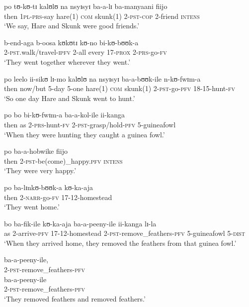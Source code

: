 \begin{exe}
\ex \gll po tʊ-kʊ-tɪ kalʊlʊ na nsyɪsyɪ ba-a-lɪ ba-manyaani fiijo\\
then \textsc{1pl}-\textsc{prs}-say hare(1) \textsc{com} skunk(1) 2-\textsc{pst}-\textsc{cop} 2-friend \textsc{intens}\\
\glt \lq We say, Hare and Skunk were good friends.'

\ex \gll b-end-aga b-oosa kʊkʊtɪ kʊ-no bi-kʊ-bʊʊk-a\\
2-\textsc{pst}.walk/travel-\textsc{ipfv} 2-all every 17-\textsc{prox} 2-\textsc{prs}-go-\textsc{fv}\\
\glt \lq They went together wherever they went.'

\ex \gll po leelo ii-sikʊ lɪ-mo kalʊlʊ na nsyɪsyɪ ba-a-bʊʊk-ile n-kʊ-fwɪm-a\\
then now/but 5-day 5-one hare(1) \textsc{com} skunk(1) 2-\textsc{pst}-go-\textsc{pfv} 18-15-hunt-\textsc{fv}\\
\glt \lq So one day Hare and Skunk went to hunt.'

\ex \gll po bo bi-kʊ-fwɪm-a ba-a-kol-ile ii-kanga\\
then as 2-\textsc{prs}-hunt-\textsc{fv} 2-\textsc{pst}-grasp/hold-\textsc{pfv} 5-guineafowl\\
\glt \lq  When they were hunting they caught a guinea fowl.'

\ex \gll po ba-a-hobwike fiijo\\
then 2-\textsc{pst}-be(come)\_happy.\textsc{pfv} \textsc{intens}\\
\glt \lq They were very happy.'

\ex \gll po ba-lɪnkʊ-bʊʊk-a kʊ-ka-aja\\
then 2-\textsc{narr}-go-\textsc{fv} 17-12-homestead\\
\glt \lq They went home.'

\ex \gll bo ba-fik-ile kʊ-ka-aja ba-a-peeny-ile ii-kanga lɪ-la\\
as 2-arrive-\textsc{pfv} 17-12-homestead 2-\textsc{pst}-remove\_feathers-\textsc{pfv} 5-guineafowl 5-\textsc{dist}\\
\glt \lq When they arrived home, they removed the feathers from that guinea fowl.'

\ex \gll ba-a-peeny-ile,\\
2-\textsc{pst}-remove\_feathers-\textsc{pfv}\\

\ex \gll ba-a-peeny-ile\\
2-\textsc{pst}-remove\_feathers-\textsc{pfv}\\
\glt \lq They removed feathers and removed feathers.'


\end{exe}
